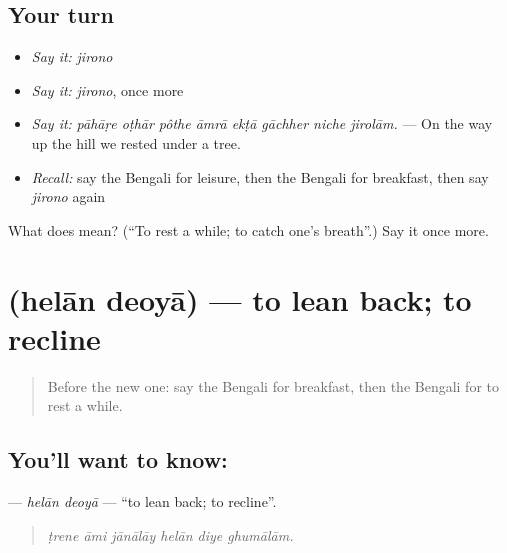 \subsection*{Your turn}
\begin{itemize}
\raggedright
  \item \emph{Say it:} \emph{jirono}
  \item \emph{Say it:} \emph{jirono}, once more
  \item \emph{Say it:} \emph{pāhāṛe oṭhār pôthe āmrā ekṭā gāchher niche jirolām.} — On the way up the hill we rested under a tree.
  \item \emph{Recall:} say the Bengali for leisure, then the Bengali for breakfast, then say \emph{jirono} again
\end{itemize}

\begin{tcolorbox}[breakable,colback=teal!4,colframe=teal!35!black,title={Before you move on}]
What does  mean? (\textquotedblleft{}To rest a while; to catch one's breath\textquotedblright{}.) Say it once more.
\end{tcolorbox}
\section[\texorpdfstring{\bn{হেলান} \bn{দেওয়া} (helān deoyā)}{হেলান দেওয়া (helān deoyā)}]{  (helān deoyā) — to lean back; to recline}

\label{lesson:BN-C404-helan-deoya}



\begin{quote}
Before the new one: say the Bengali for breakfast, then the Bengali for to rest a while.
\end{quote}

\subsection*{You'll want to know:  }
\textbf{ } — \emph{helān deoyā} — \textquotedblleft{}to lean back; to recline\textquotedblright{}.

\begin{quote}
     
\end{quote}

\begin{quote}
\emph{ṭrene āmi jānālāy helān diye ghumālām.}
\end{quote}

